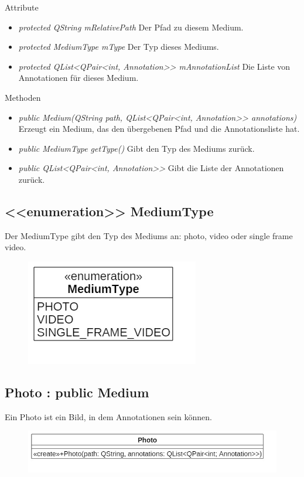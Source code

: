 Attribute
\begin{itemize}
\item\textit{protected QString mRelativePath} Der Pfad zu diesem Medium.
\item\textit{protected MediumType mType} Der Typ dieses Mediums.
\item\textit{protected QList<QPair<int, Annotation>> mAnnotationList} Die Liste von Annotationen für dieses Medium.
\end{itemize}

Methoden
\begin{itemize}
\item \textit{public Medium(QString path, QList<QPair<int, Annotation>> annotations)} Erzeugt ein Medium, das den übergebenen Pfad und die Annotationsliste hat.
\item \textit{public MediumType getType()} Gibt den Typ des Mediums zurück.
\item \textit{public QList<QPair<int, Annotation>>} Gibt die Liste der Annotationen zurück.
\end{itemize}

\subsection*{<<enumeration>> MediumType}
Der MediumType gibt den Typ des Mediums an: photo, video oder single frame video.

\begin{figure}[H]
\centering
\includegraphics[scale=0.5]{img/Klassendiagramm/Klassen/MediumType}
\label{fig:mediumType}
\end{figure}

\subsection*{Photo : public Medium}
Ein Photo ist ein Bild, in dem Annotationen sein können.

\begin{figure}[H]
\centering
\includegraphics[scale=0.5]{img/Klassendiagramm/Klassen/Photo}
\label{fig:photo}
\end{figure}


